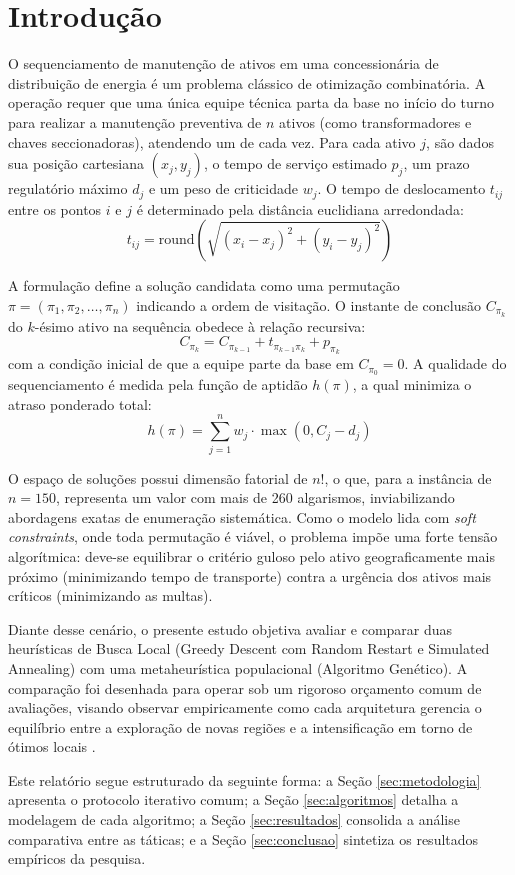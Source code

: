 \section{Introdução}
\label{sec:introducao}

O sequenciamento de manutenção de ativos em uma concessionária de distribuição de energia é um problema clássico de otimização combinatória. A operação requer que uma única equipe técnica parta da base no início do turno para realizar a manutenção preventiva de $n$ ativos (como transformadores e chaves seccionadoras), atendendo um de cada vez. Para cada ativo $j$, são dados sua posição cartesiana $(x_j, y_j)$, o tempo de serviço estimado $p_j$, um prazo regulatório máximo $d_j$ e um peso de criticidade $w_j$. O tempo de deslocamento $t_{ij}$ entre os pontos $i$ e $j$ é determinado pela distância euclidiana arredondada:
\begin{equation}
t_{ij} = \text{round}\left(\sqrt{(x_i - x_j)^2 + (y_i - y_j)^2}\right)
\label{eq:deslocamento}
\end{equation}

A formulação define a solução candidata como uma permutação $\pi = (\pi_1, \pi_2, \dots, \pi_n)$ indicando a ordem de visitação. O instante de conclusão $C_{\pi_k}$ do $k$-ésimo ativo na sequência obedece à relação recursiva:
\begin{equation}
C_{\pi_k} = C_{\pi_{k-1}} + t_{\pi_{k-1}\pi_k} + p_{\pi_k}
\label{eq:conclusao}
\end{equation}
com a condição inicial de que a equipe parte da base em $C_{\pi_0} = 0$. A qualidade do sequenciamento é medida pela função de aptidão $h(\pi)$, a qual minimiza o atraso ponderado total:
\begin{equation}
h(\pi) = \sum_{j=1}^{n} w_j \cdot \max(0, C_j - d_j)
\label{eq:fitness}
\end{equation}

O espaço de soluções possui dimensão fatorial de $n!$, o que, para a instância de $n=150$, representa um valor com mais de 260 algarismos, inviabilizando abordagens exatas de enumeração sistemática. Como o modelo lida com \textit{soft constraints}, onde toda permutação é viável, o problema impõe uma forte tensão algorítmica: deve-se equilibrar o critério guloso pelo ativo geograficamente mais próximo (minimizando tempo de transporte) contra a urgência dos ativos mais críticos (minimizando as multas).

Diante desse cenário, o presente estudo objetiva avaliar e comparar duas heurísticas de Busca Local (Greedy Descent com Random Restart e Simulated Annealing) com uma metaheurística populacional (Algoritmo Genético). A comparação foi desenhada para operar sob um rigoroso orçamento comum de avaliações, visando observar empiricamente como cada arquitetura gerencia o equilíbrio entre a exploração de novas regiões e a intensificação em torno de ótimos locais \cite{poole2010}.

Este relatório segue estruturado da seguinte forma: a Seção \ref{sec:metodologia} apresenta o protocolo iterativo comum; a Seção \ref{sec:algoritmos} detalha a modelagem de cada algoritmo; a Seção \ref{sec:resultados} consolida a análise comparativa entre as táticas; e a Seção \ref{sec:conclusao} sintetiza os resultados empíricos da pesquisa.